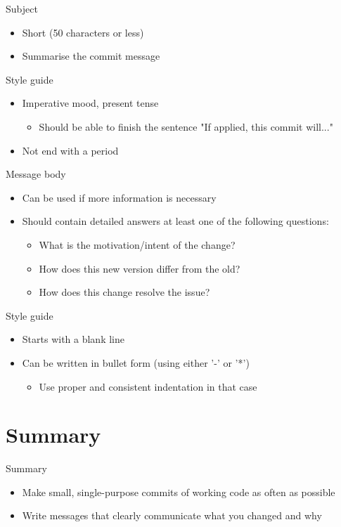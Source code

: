 \begin{frame}
\begin{block}{Subject}
  \begin{itemize}
      \item Short (50 characters or less)
      \item Summarise the commit message
  \end{itemize}
\end{block}
\begin{block}{Style guide}
  \begin{itemize}
      \item Imperative mood, present tense
      \begin{itemize}
          \item Should be able to finish the sentence "If applied, this commit will..."
      \end{itemize}
      \item Not end with a period
  \end{itemize}
\end{block}
\end{frame}

\begin{frame}
\begin{block}{Message body}
  \begin{itemize}
      \item Can be used if more information is necessary
      \item Should contain detailed answers at least one of the following questions:
      \begin{itemize}
          \item What is the motivation/intent of the change?
          \item How does this new version differ from the old?
          \item How does this change resolve the issue?
      \end{itemize}
  \end{itemize}
\end{block}
\begin{block}{Style guide}
  \begin{itemize}
    \item Starts with a blank line
    \item Can be written in bullet form (using either '-' or '*')
    \begin{itemize}
        \item Use proper and consistent indentation in that case
    \end{itemize}
  \end{itemize}
\end{block}
\end{frame}

\section{Summary}
\begin{frame}
\begin{block}{Summary}
\begin{itemize}
    \item Make small, single-purpose commits of working code as often as possible
    \item Write messages that clearly communicate what you changed and why
\end{itemize}
    
\end{block}
    
\end{frame}
